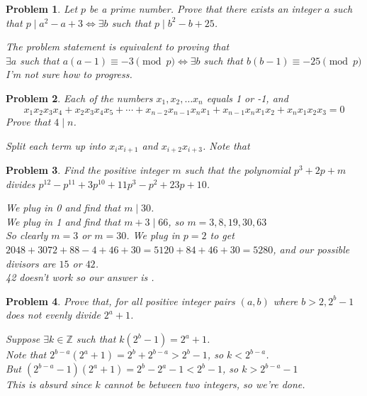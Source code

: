\documentclass{scrartcl}
\newtheorem{a_problem}{Problem}
\begin{document}
\begin{a_problem}
	Let $p$ be a prime number. Prove that there exists an integer $a$ such that $p \mid a^2 - a + 3 \iff \exists b$ such that $p \mid b^2 - b + 25$.
	\begin{soln}
		The problem statement is equivalent to proving that \\
		$\exists a$ such that $a(a-1) \equiv -3 \pmod{p} \iff \exists b$ such that $b(b-1) \equiv -25 \pmod{p}$ \\
		I'm not sure how to progress.
	\end{soln}
\end{a_problem}

\begin{a_problem}
	Each of the numbers $x_1, x_2,\dots x_n$ equals 1 or -1, and
	\[x_1x_2x_3x_4 + x_2x_3x_4x_5 + \cdots + x_{n-2}x_{n-1}x_nx_1 + x_{n-1}x_nx_1x_2 + x_nx_1x_2x_3 = 0\]
	Prove that $4 \mid n$.
	\begin{soln}
		Split each term up into $x_i x_{i+1}$ and $x_{i+2}x_{i+3}$. Note that
	\end{soln}
\end{a_problem}

\setcounter{a_problem}{397}
\begin{a_problem}
Find the positive integer $m$ such that the polynomial $p^3 + 2p + m$ divides $p^{12} - p^{11} + 3p^{10} + 11p^3 - p^2 + 23p + 10$.
	\begin{soln}
		We plug in 0 and find that $m \mid 30$. \\
		We plug in 1 and find that $m + 3 \mid 66$, so $m = 3,8,19,30,63$ \\
		So clearly $m = 3$ or $m = 30$.
		We plug in $p=2$ to get $2048 + 3072 + 88 - 4 + 46 + 30 = 5120 + 84 + 46 + 30 = 5280$, and our possible divisors are $15$ or $42$. \\
		42 doesn't work so our answer is .
	\end{soln}
\end{a_problem}
\begin{a_problem}
	Prove that, for all positive integer pairs $(a,b)$ where $b>2, 2^b - 1$ does not evenly divide $2^a + 1$.
	\begin{soln}
		Suppose $\exists k \in \mathbb{Z}$ such that $k(2^b - 1) = 2^a + 1$. \\
		Note that $2^{b-a}\left( 2^a +1\right) = 2^b + 2^{b-a} > 2^b - 1$, so $k < 2^{b-a}$. \\
		But $\left(2^{b-a} - 1\right)\left(2^a + 1\right) = 2^b - 2^a - 1 < 2^b - 1$, so $k > 2^{b-a}-1$ \\
		This is absurd since $k$ cannot be between two integers, so we're done.

	\end{soln}
\end{a_problem}
\end{document}
